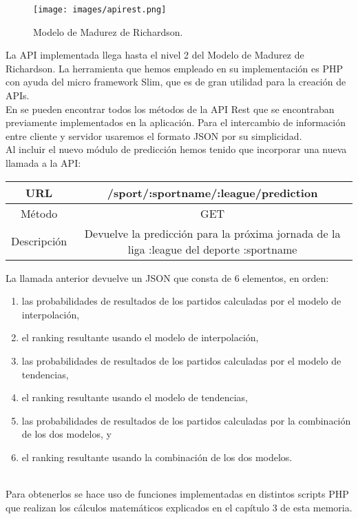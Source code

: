 \begin{figure}[H]
	\centering
	\texttt{[image: images/apirest.png]}
	\caption{Modelo de Madurez de Richardson.}
\end{figure}

La API implementada llega hasta el nivel 2 del Modelo de Madurez de Richardson. La herramienta que hemos empleado en su implementación es PHP con ayuda del micro framework Slim, que es de gran utilidad para la creación de APIs.\\

En \cite[Anexo A]{tfgjose} se pueden encontrar todos los métodos de la API Rest que se encontraban previamente implementados en la aplicación. Para el intercambio de información entre cliente y servidor usaremos el formato JSON por su simplicidad. \\

Al incluir el nuevo módulo de predicción hemos tenido que incorporar una nueva llamada a la API:
{\small \begin{center}
	\begin{tabular}{|c|c|}
	\hline URL  & /sport/:sportname/:league/prediction \\ 
	\hline Método & GET \\ 
	\hline Descripción & Devuelve la predicción para la próxima jornada de la liga :league del deporte :sportname\\ 
	\hline 
\end{tabular} 
\end{center}}

La llamada anterior devuelve un JSON que consta de 6 elementos, en orden:
\begin{enumerate}
	\item las probabilidades de resultados de los partidos calculadas por el modelo de interpolación,
	\item el ranking resultante usando el modelo de interpolación,
	\item las probabilidades de resultados de los partidos calculadas por el modelo de tendencias,
	\item el ranking resultante usando el modelo de tendencias,
	\item las probabilidades de resultados de los partidos calculadas por la combinación de los dos modelos, y
	\item el ranking resultante usando la combinación de los dos modelos.
\end{enumerate}

\ \\
Para obtenerlos se hace uso de funciones implementadas en distintos scripts PHP que realizan los cálculos matemáticos explicados en el capítulo 3 de esta memoria. \\


